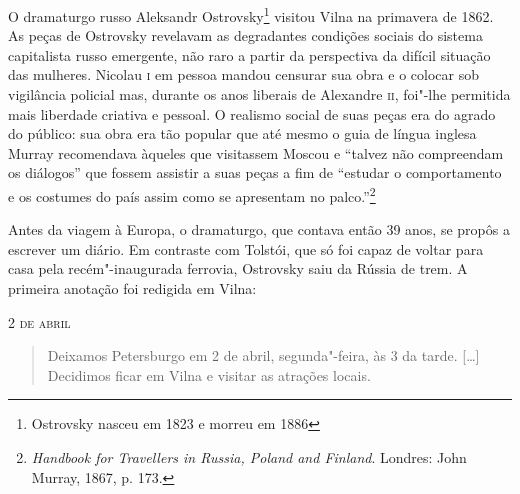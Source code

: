 O dramaturgo russo Aleksandr Ostrovsky\footnote{Ostrovsky nasceu em 1823 e morreu em 1886} visitou Vilna na
primavera de 1862. As peças de Ostrovsky revelavam as degradantes
condições sociais do sistema capitalista russo emergente, não raro a
partir da perspectiva da difícil situação das mulheres. Nicolau \textsc{i} em
pessoa mandou censurar sua obra e o colocar sob vigilância policial mas,
durante os anos liberais de Alexandre \textsc{ii}, foi"-lhe permitida mais
liberdade criativa e pessoal. O realismo social de suas peças era do
agrado do público: sua obra era tão popular que até mesmo o guia de
língua inglesa Murray recomendava àqueles que visitassem Moscou e
``talvez não compreendam os diálogos'' que fossem assistir a suas peças
a fim de ``estudar o comportamento e os costumes do país assim como se
apresentam no palco.''\footnote{\textit{Handbook for Travellers in Russia, Poland and Finland}. Londres: John Murray, 1867, p. 173.}

Antes da viagem à Europa, o dramaturgo, que contava então 39 anos, se
propôs a escrever um diário. Em contraste com Tolstói, que só foi capaz
de voltar para casa pela recém"-inaugurada ferrovia, Ostrovsky saiu da
Rússia de trem. A primeira anotação foi redigida em Vilna:

\begin{flushright}
\smallskip\hfill\textsc{2 de abril}
\end{flushright}
\begin{quote}
Deixamos Petersburgo em 2 de abril, segunda"-feira, às 3 da tarde.
[\ldots{}] Decidimos ficar em Vilna e visitar as atrações locais.
\end{quote}

